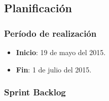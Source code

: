 \subsection{Planificación}

\subsubsection{Período de realización}

\begin{itemize}
    \item \textbf{Inicio}: 19 de mayo del 2015.
    \item \textbf{Fin}: 1 de julio del 2015.
\end{itemize}

\subsubsection{Sprint Backlog}


